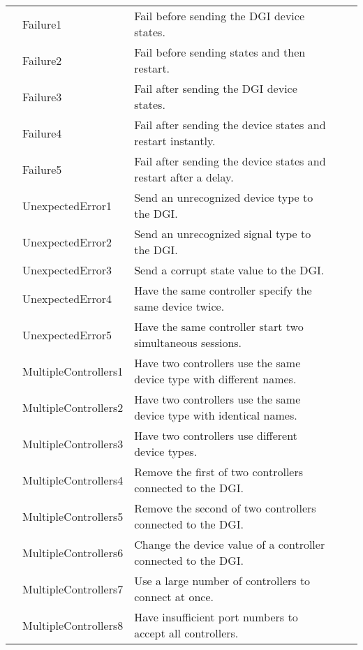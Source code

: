 \documentclass{article}
\newcounter{rownum}
\newcommand\rownumber{\stepcounter{rownum}\arabic{rownum}}
\begin{document}
\begin{longtable}{|c|p{4cm}|p{5cm}|c|p{6cm}|}
    \rownumber & Failure1 & Fail before sending the DGI device states.
               & & \\
    \rownumber & Failure2 & Fail before sending states and then restart.
               & & \\
    \rownumber & Failure3 & Fail after sending the DGI device states.
               & & \\
    \rownumber & Failure4 & Fail after sending the device states and restart instantly.
               & & \\
    \rownumber & Failure5 & Fail after sending the device states and restart after a delay.
               & & \\
    \rownumber & UnexpectedError1 & Send an unrecognized device type to the DGI.
               & & \\
    \rownumber & UnexpectedError2 & Send an unrecognized signal type to the DGI.
               & & \\
    \rownumber & UnexpectedError3 & Send a corrupt state value to the DGI.
               & & \\
    \rownumber & UnexpectedError4 & Have the same controller specify the same device twice.
               & & \\
    \rownumber & UnexpectedError5 & Have the same controller start two simultaneous sessions.
               & & \\
    \rownumber & MultipleControllers1 & Have two controllers use the same device type with different names.
               & & \\
    \rownumber & MultipleControllers2 & Have two controllers use the same device type with identical names.
               & & \\
    \rownumber & MultipleControllers3 & Have two controllers use different device types.
               & & \\
    \rownumber & MultipleControllers4 & Remove the first of two controllers connected to the DGI.
               & & \\
    \rownumber & MultipleControllers5 & Remove the second of two controllers connected to the DGI.
               & & \\
    \rownumber & MultipleControllers6 & Change the device value of a controller connected to the DGI.
               & & \\
    \rownumber & MultipleControllers7 & Use a large number of controllers to connect at once.
               & & \\
    \rownumber & MultipleControllers8 & Have insufficient port numbers to accept all controllers.

\end{longtable}
\end{document}
